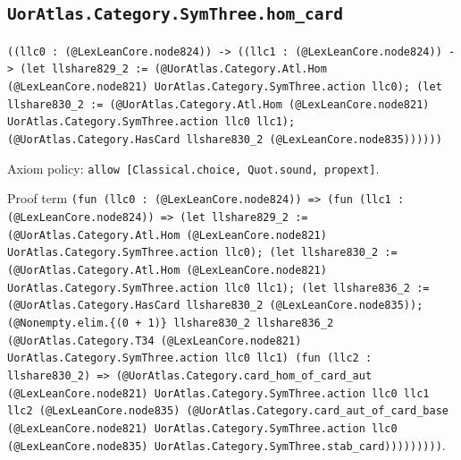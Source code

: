 \documentclass[11pt]{article}
\begin{document}
\subsection*{\texttt{UorAtlas.Category.SymThree.hom\_card}}
\noindent\texttt{((llc0 : (@LexLeanCore.node824)) -> ((llc1 : (@LexLeanCore.node824)) -> (let llshare829\_2 := (@UorAtlas.Category.Atl.Hom (@LexLeanCore.node821) UorAtlas.Category.SymThree.action llc0); (let llshare830\_2 := (@UorAtlas.Category.Atl.Hom (@LexLeanCore.node821) UorAtlas.Category.SymThree.action llc0 llc1); (@UorAtlas.Category.HasCard llshare830\_2 (@LexLeanCore.node835))))))}\par
\noindent Axiom policy: \texttt{allow [Classical.choice, Quot.sound, propext]}.\par
\noindent Proof term \texttt{(fun (llc0 : (@LexLeanCore.node824)) => (fun (llc1 : (@LexLeanCore.node824)) => (let llshare829\_2 := (@UorAtlas.Category.Atl.Hom (@LexLeanCore.node821) UorAtlas.Category.SymThree.action llc0); (let llshare830\_2 := (@UorAtlas.Category.Atl.Hom (@LexLeanCore.node821) UorAtlas.Category.SymThree.action llc0 llc1); (let llshare836\_2 := (@UorAtlas.Category.HasCard llshare830\_2 (@LexLeanCore.node835)); (@Nonempty.elim.\{(0 + 1)\} llshare830\_2 llshare836\_2 (@UorAtlas.Category.T34 (@LexLeanCore.node821) UorAtlas.Category.SymThree.action llc0 llc1) (fun (llc2 : llshare830\_2) => (@UorAtlas.Category.card\_hom\_of\_card\_aut (@LexLeanCore.node821) UorAtlas.Category.SymThree.action llc0 llc1 llc2 (@LexLeanCore.node835) (@UorAtlas.Category.card\_aut\_of\_card\_base (@LexLeanCore.node821) UorAtlas.Category.SymThree.action llc0 (@LexLeanCore.node835) UorAtlas.Category.SymThree.stab\_card)))))))))}.\par
\end{document}
